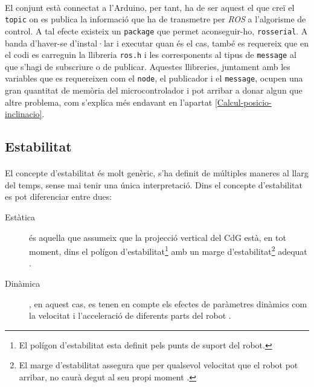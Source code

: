 \documentclass[12pt,a4paper,final,twoside]{article}
\begin{document}
\paragraph{}El conjunt està connectat a l'Arduino, per tant, ha de ser aquest el que creï el \texttt{topic} on es publica la informació que ha de transmetre per \textit{ROS} a l'algorisme de control. A tal efecte existeix un \texttt{package} que permet aconseguir-ho, \texttt{rosserial}. A banda d'haver-se d'instal·lar i executar quan és el cas, també es requereix que en el codi es carreguin la llibreria \texttt{ros.h} i les corresponents al tipus de \texttt{message} al que s'hagi de subscriure o de publicar. Aquestes llibreries, juntament amb les variables que es requereixen com el \texttt{node}, el publicador i el \texttt{message}, ocupen una gran quantitat de memòria del microcontrolador i pot arribar a donar algun que altre problema, com s'explica més endavant en l'apartat \ref{Calcul-posicio-inclinacio}. 



\subsection{Estabilitat}
\label{Estabilitat}

\paragraph{}El concepte d'estabilitat és molt genèric, s'ha definit de múltiples maneres al llarg del temps, sense mai tenir una única interpretació. Dins el concepte d'estabilitat es pot diferenciar entre dues:
\begin{description}

\item[Estàtica] és aquella que assumeix que la projecció vertical del CdG està, en tot moment, dins el polígon d'estabilitat\footnote{El polígon d'estabilitat esta definit pels punts de suport del robot.} amb un marge d'estabilitat\footnote{El marge d'estabilitat assegura que per qualsevol velocitat que el robot pot arribar, no caurà degut al seu propi moment \cite{Hugel1999}.} adequat \cite{Hugel1999}.

\item[Dinàmica], en aquest cas, es tenen en compte els efectes de paràmetres dinàmics com la velocitat i l'acceleració de diferents parts del robot \cite{Yazdani2012}.

\end{description}
\end{document}

